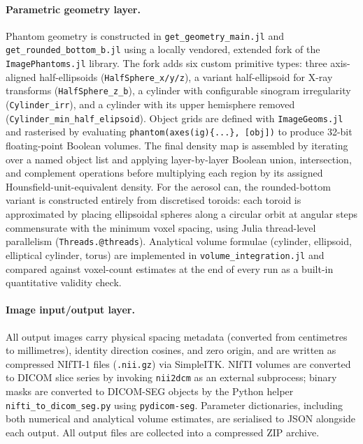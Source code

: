 \documentclass[preprint,12pt, a4paper]{elsarticle}
\begin{document}
\paragraph{Parametric geometry layer.}
Phantom geometry is constructed in \mbox{\texttt{get\_geometry\_main.jl}} and
\mbox{\texttt{get\_rounded\_bottom\_b.jl}} using a locally vendored, extended fork of the \mbox{\texttt{ImagePhantoms.jl}} library. The fork adds six custom primitive types: three axis-aligned half-ellipsoids (\mbox{\texttt{HalfSphere\_x/y/z}}), a variant half-ellipsoid for X-ray transforms (\mbox{\texttt{HalfSphere\_z\_b}}), a cylinder with configurable sinogram irregularity (\mbox{\texttt{Cylinder\_irr}}), and a cylinder with its upper hemisphere removed (\mbox{\texttt{Cylinder\_min\_half\_elipsoid}}). Object grids are defined with \mbox{\texttt{ImageGeoms.jl}} and rasterised by evaluating \mbox{\texttt{phantom(axes(ig)\{...\}, [obj])}} to produce 32-bit floating-point Boolean volumes. The final density map is assembled by iterating over a named object list and applying layer-by-layer Boolean union, intersection, and complement operations before multiplying each region by its assigned Hounsfield-unit-equivalent density. For the aerosol can, the rounded-bottom variant is constructed entirely from discretised toroids: each toroid is approximated by placing ellipsoidal spheres along a circular orbit at angular steps commensurate with the minimum voxel spacing, using Julia thread-level parallelism (\mbox{\texttt{Threads.@threads}}). Analytical volume formulae (cylinder, ellipsoid, elliptical cylinder, torus) are implemented in \mbox{\texttt{volume\_integration.jl}} and compared against voxel-count estimates at the end of every run as a built-in quantitative validity check.

\paragraph{Image input/output layer.}
All output images carry physical spacing metadata (converted from centimetres to millimetres), identity direction cosines, and zero origin, and are written as compressed NIfTI-1 files (\mbox{\texttt{.nii.gz}}) via SimpleITK. NIfTI volumes are converted to DICOM slice series by invoking \mbox{\texttt{nii2dcm}} as an external subprocess; binary masks are converted to DICOM-SEG objects by the Python helper \mbox{\texttt{nifti\_to\_dicom\_seg.py}} using \mbox{\texttt{pydicom-seg}}. Parameter dictionaries, including both numerical and analytical volume estimates, are serialised to JSON alongside each output. All output files are collected into a compressed ZIP archive.
\end{document}
